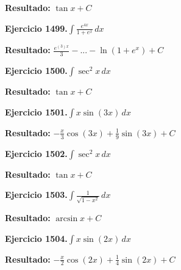 \documentclass[10pt,a4paper]{article}
\begin{document}
\begin{solbox}
\textbf{Resultado:} \(\displaystyle \tan x + C\)
\end{solbox}

\begin{ejbox}
\textbf{Ejercicio 1499.}\quad $\int \frac{e^{4x}}{1+e^{x}}\,dx$
\end{ejbox}

\begin{solbox}
\textbf{Resultado:} \(\displaystyle \frac{e^{(3)x}}{3} - ... - \ln(1+e^x) + C\)
\end{solbox}

\begin{ejbox}
\textbf{Ejercicio 1500.}\quad $\int \sec^2 x\,dx$
\end{ejbox}

\begin{solbox}
\textbf{Resultado:} \(\displaystyle \tan x + C\)
\end{solbox}

\newpage
\begin{ejbox}
\textbf{Ejercicio 1501.}\quad $\int x \sin(3x)\,dx$
\end{ejbox}

\begin{solbox}
\textbf{Resultado:} \(\displaystyle -\frac{x}{3}\cos(3x) + \frac{1}{9}\sin(3x) + C\)
\end{solbox}

\begin{ejbox}
\textbf{Ejercicio 1502.}\quad $\int \sec^2 x\,dx$
\end{ejbox}

\begin{solbox}
\textbf{Resultado:} \(\displaystyle \tan x + C\)
\end{solbox}

\begin{ejbox}
\textbf{Ejercicio 1503.}\quad $\int \frac{1}{\sqrt{1-x^2}}\,dx$
\end{ejbox}

\begin{solbox}
\textbf{Resultado:} \(\displaystyle \arcsin x + C\)
\end{solbox}

\newpage
\begin{ejbox}
\textbf{Ejercicio 1504.}\quad $\int x \sin(2x)\,dx$
\end{ejbox}

\begin{solbox}
\textbf{Resultado:} \(\displaystyle -\frac{x}{2}\cos(2x) + \frac{1}{4}\sin(2x) + C\)
\end{solbox}
\end{document}
